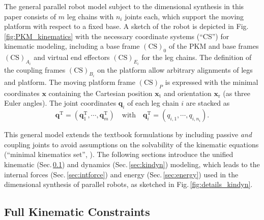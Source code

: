 \documentclass[fleqn,a4paper,10pt]{article}
\newcommand{\bm}[1]{\mathbf{#1}}
\renewcommand{\Phi}[1]{\varPhi{#1}}
\newcommand{\transp}[0]{{\mathrm{T}}}
\newcommand{\ks}[1]{{(\mathrm{CS})}_{#1}}
\renewenvironment{figure}
  {\par\vspace{6pt}\noindent\minipage{\linewidth}}
  {\endminipage\par\vspace{6pt}}
\begin{document}
\begin{multicols}{2}
The general parallel robot model subject to the dimensional synthesis in this paper consists of $m$ leg chains with $n_i$ joints each, which support the moving platform with respect to a fixed base.
A sketch of the robot is depicted in Fig.\,\ref{fig:PKM_kinematics} with the necessary coordinate systems (``CS'') for kinematic modeling, including a base frame $\ks{0}$ of the PKM and base frames $\ks{A_i}$ and virtual end effectors $\ks{E_i}$ for the leg chains.
The definition of the coupling frames $\ks{B_i}$ on the platform allow arbitrary alignments of legs and platform.
The moving platform frame $\ks{P}$ is expressed with the minimal coordinates $\bm{x}$ containing the Cartesian position $\bm{x}_\mathrm{t}$ and orientation  $\bm{x}_\mathrm{r}$ (as three Euler angles).
The joint coordinates $\bm{q}_i$ of each leg chain $i$ are stacked as
%
\begin{equation}
\bm{q}^\transp=(\bm{q}_{1}^\transp,\cdots,\bm{q}_{m}^\transp) \quad \mathrm{with}  \quad \bm{q}_i^\transp=(q_{i,1},\cdots,q_{i,n_i}).
\end{equation}

\begin{figure}
    \graphicspath{{./Bilder/}}
    \centering
    \vspace{-0.2cm}
    
    \vspace{-0.4cm} %
    \label{fig:PKM_kinematics}
\end{figure}


This general model extends the textbook formulations \cite{Merlet2006,BriotKha2015} by including passive \emph{and} coupling joints to avoid assumptions on the solvability of the kinematic equations (``minimal kinematics set'', \cite{Merlet2006}).
The following sections introduce the unified kinematic (Sec.\,\ref{sec:kinematics}) and dynamics (Sec.\,\ref{sec:kindyn}) modeling, which leads to the internal forces (Sec.\,\ref{sec:intforce}) and energy (Sec.\,\ref{sec:energy}) used in the dimensional synthesis of parallel robots, as sketched in Fig.\,\ref{fig:details_kindyn}.



\subsection{Full Kinematic Constraints}
\label{sec:kinematics}



\end{multicols}
\end{document}
